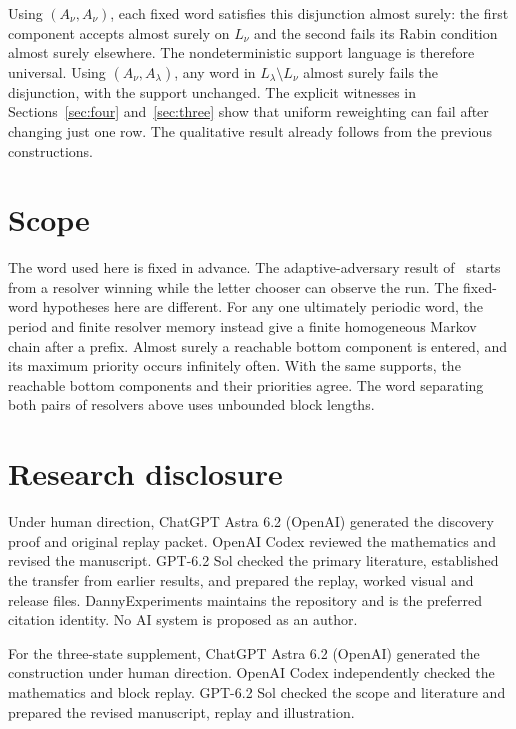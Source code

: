 \documentclass[11pt]{amsart}
\begin{document}
Using \((A_\nu,A_\nu)\), each fixed word satisfies this disjunction almost surely: the first component accepts almost surely on \(L_\nu\) and the second fails its Rabin condition almost surely elsewhere. The nondeterministic support language is therefore universal. Using \((A_\nu,A_\lambda)\), any word in \(L_\lambda\setminus L_\nu\) almost surely fails the disjunction, with the support unchanged. The explicit witnesses in Sections~\ref{sec:four} and~\ref{sec:three} show that uniform reweighting can fail after changing just one row. The qualitative result already follows from the previous constructions.

\section{Scope}
The word used here is fixed in advance. The adaptive-adversary result of~\cite[\S2]{HPT} starts from a resolver winning while the letter chooser can observe the run. The fixed-word hypotheses here are different. For any one ultimately periodic word, the period and finite resolver memory instead give a finite homogeneous Markov chain after a prefix. Almost surely a reachable bottom component is entered, and its maximum priority occurs infinitely often. With the same supports, the reachable bottom components and their priorities agree. The word separating both pairs of resolvers above uses unbounded block lengths.

\section*{Research disclosure}
Under human direction, ChatGPT Astra 6.2 (OpenAI) generated the discovery proof and original replay packet. OpenAI Codex reviewed the mathematics and revised the manuscript. GPT-6.2 Sol checked the primary literature, established the transfer from earlier results, and prepared the replay, worked visual and release files. DannyExperiments maintains the repository and is the preferred citation identity. No AI system is proposed as an author.

For the three-state supplement, ChatGPT Astra 6.2 (OpenAI) generated the construction under human direction. OpenAI Codex independently checked the mathematics and block replay. GPT-6.2 Sol checked the scope and literature and prepared the revised manuscript, replay and illustration.
\end{document}
